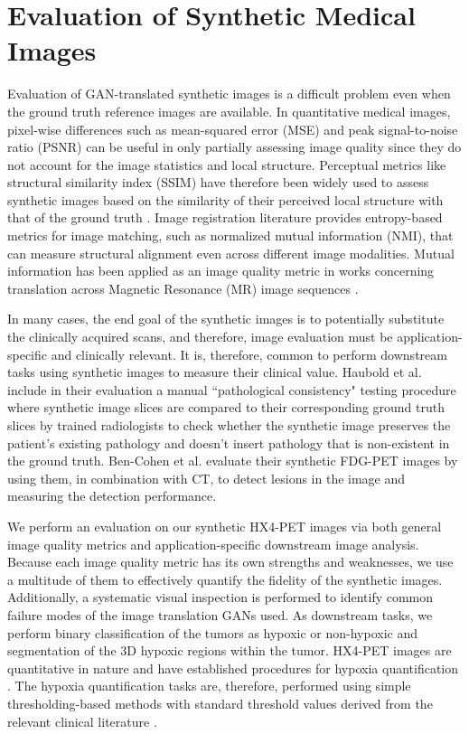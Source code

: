 \section{Evaluation of Synthetic Medical Images}

Evaluation of GAN-translated synthetic images is a difficult problem even when the ground truth reference images are available. In quantitative medical images, pixel-wise differences such as mean-squared error (MSE) and peak signal-to-noise ratio (PSNR) can be useful in only partially assessing image quality since they do not account for the image statistics and local structure. Perceptual metrics like structural similarity index (SSIM) have therefore been widely used to assess synthetic images based on the similarity of their perceived local structure with that of the ground truth \cite{yi2019generative}. Image registration literature provides entropy-based metrics for image matching, such as normalized mutual information (NMI), that can measure structural alignment even across different image modalities. Mutual information has been applied as an image quality metric in works concerning translation across Magnetic Resonance (MR) image sequences \cite{yang2018mri, welander2018generative}. 

In many cases, the end goal of the synthetic images is to potentially substitute the clinically acquired scans, and therefore, image evaluation must be application-specific and clinically relevant. It is, therefore, common to perform downstream tasks using synthetic images to measure their clinical value. Haubold et al. \cite{haubold2021contrast} include in their evaluation a manual ``pathological consistency" testing procedure where synthetic image slices are compared to their corresponding ground truth slices by trained radiologists to check whether the synthetic image preserves the patient's existing pathology and doesn't insert pathology that is non-existent in the ground truth. Ben-Cohen et al. \cite{bencohen2018crossmodality} evaluate their synthetic FDG-PET images by using them, in combination with CT, to detect lesions in the image and measuring the detection performance.  

We perform an evaluation on our synthetic HX4-PET images via both general image quality metrics and application-specific downstream image analysis. Because each image quality metric has its own strengths and weaknesses, we use a multitude of them to effectively quantify the fidelity of the synthetic images. Additionally, a systematic visual inspection is performed to identify common failure modes of the image translation GANs used. As downstream tasks, we perform binary classification of the tumors as hypoxic or non-hypoxic and segmentation of the 3D hypoxic regions within the tumor. HX4-PET images are quantitative in nature and have established procedures for hypoxia quantification \cite{zegers2013hypoxia}. The hypoxia quantification tasks are, therefore, performed using simple thresholding-based methods with standard threshold values derived from the relevant clinical literature \cite{zegers2013hypoxia, even2017predicting}.